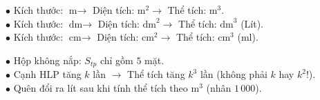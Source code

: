 \documentclass[14pt,a4paper,oneside]{extbook}
\begin{document}
\noindent
\begin{minipage}[t]{0.54\textwidth}
  \begin{tcolorbox}[
    enhanced,
    title={\footnotesize\bfseries\color{white}\faCheckSquare\ Bảng đơn vị tương ứng bắt buộc},
    colback=green!3!white,
    colframe=green!60!black,
    arc=2.5mm, boxrule=0.8pt, top=1.8mm, bottom=1.8mm, left=2.2mm, right=2.2mm
  ]
    \footnotesize
    $\bullet$ Kích thước: $\text{m} \rightarrow$ Diện tích: $\text{m}^2 \rightarrow$ Thể tích: $\text{m}^3$.\\
    $\bullet$ Kích thước: $\text{dm} \rightarrow$ Diện tích: $\text{dm}^2 \rightarrow$ Thể tích: $\text{dm}^3$ (Lít).\\
    $\bullet$ Kích thước: $\text{cm} \rightarrow$ Diện tích: $\text{cm}^2 \rightarrow$ Thể tích: $\text{cm}^3$ (ml).
  \end{tcolorbox}
\end{minipage}%
\hfill
\begin{minipage}[t]{0.44\textwidth}
  \begin{tcolorbox}[
    enhanced,
    title={\footnotesize\bfseries\color{white}\faExclamationTriangle\ Mẹo tránh bẫy trắc nghiệm},
    colback=red!2!white,
    colframe=red!70!black,
    arc=2.5mm, boxrule=0.8pt, top=1.8mm, bottom=1.8mm, left=2.2mm, right=2.2mm
  ]
    \footnotesize
    $\bullet$ Hộp không nắp: $S_{tp}$ chỉ gồm $5$ mặt.\\
    $\bullet$ Cạnh HLP tăng $k$ lần $\rightarrow$ Thể tích tăng $k^3$ lần (không phải $k$ hay $k^2$!).\\
    $\bullet$ Quên đổi ra lít sau khi tính thể tích theo $\text{m}^3$ (nhân $1\,000$).
  \end{tcolorbox}
\end{minipage}
\end{document}

